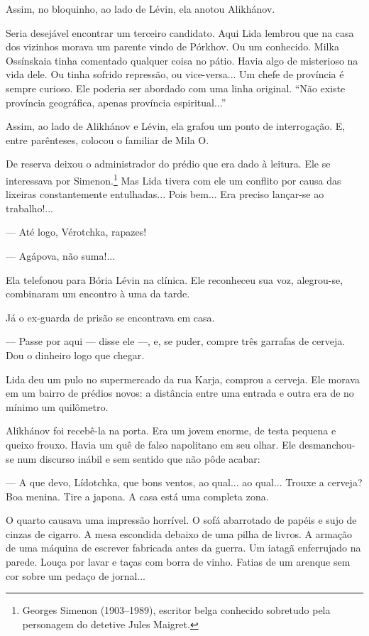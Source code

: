 Assim, no bloquinho, ao lado de Lévin, ela anotou Alikhánov.

Seria desejável encontrar um terceiro candidato. Aqui Lida lembrou que
na casa dos vizinhos morava um parente vindo de Pórkhov. Ou um
conhecido. Milka Ossínskaia tinha comentado qualquer coisa no pátio.
Havia algo de misterioso na vida dele. Ou tinha sofrido repressão, ou
vice-versa... Um chefe de província é sempre curioso. Ele poderia ser
abordado com uma linha original. ``Não existe província geográfica,
apenas província espiritual...''

Assim, ao lado de Alikhánov e Lévin, ela grafou um ponto de
interrogação. E, entre parênteses, colocou o familiar de Mila O.

De reserva deixou o administrador do prédio que era dado à leitura. Ele
se interessava por Simenon.\footnote{Georges Simenon (1903--1989),
  escritor belga conhecido sobretudo pela personagem do detetive Jules
  Maigret.} Mas Lida tivera com ele um conflito por causa das lixeiras
constantemente entulhadas... Pois bem... Era preciso lançar-se ao
trabalho!...

--- Até logo, Vérotchka, rapazes!

--- Agápova, não suma!...

Ela telefonou para Bória Lévin na clínica. Ele reconheceu sua voz,
alegrou-se, combinaram um encontro à uma da tarde.

Já o ex-guarda de prisão se encontrava em casa.

--- Passe por aqui --- disse ele ---, e, se puder, compre três garrafas
de cerveja. Dou o dinheiro logo que chegar.

Lida deu um pulo no supermercado da rua Karja, comprou a cerveja. Ele
morava em um bairro de prédios novos: a distância entre uma entrada e
outra era de no mínimo um quilômetro.

Alikhánov foi recebê-la na porta. Era um jovem enorme, de testa pequena
e queixo frouxo. Havia um quê de falso napolitano em seu olhar. Ele
desmanchou-se num discurso inábil e sem sentido que não pôde acabar:

--- A que devo, Lídotchka, que bons ventos, ao qual... ao qual... Trouxe
a cerveja? Boa menina. Tire a japona. A casa está uma completa zona.

O quarto causava uma impressão horrível. O sofá abarrotado de papéis e
sujo de cinzas de cigarro. A mesa escondida debaixo de uma pilha de
livros. A armação de uma máquina de escrever fabricada antes da guerra.
Um iatagã enferrujado na parede. Louça por lavar e taças com borra de
vinho. Fatias de um arenque sem cor sobre um pedaço de jornal...

